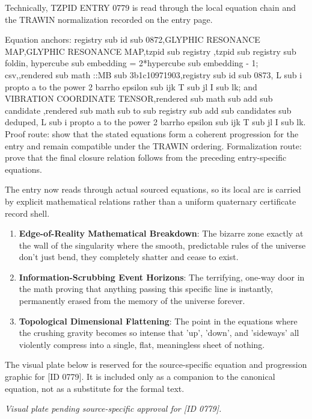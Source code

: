 Technically, TZPID ENTRY 0779 is read through the local equation chain and the TRAWIN normalization recorded on the entry page.

Equation anchors: registry sub id sub 0872,GLYPHIC RESONANCE MAP,GLYPHIC RESONANCE MAP,tzpid sub registry ,tzpid sub registry sub foldin, hypercube sub embedding = 2*hypercube sub embedding - 1; csv,,rendered sub math ::MB sub 3b1c10971903,registry sub id sub 0873, L sub i propto a to the power 2 barrho epsilon sub ijk T sub jl I sub lk; and VIBRATION COORDINATE TENSOR,rendered sub math sub add sub candidate ,rendered sub math sub to sub registry sub add sub candidates sub deduped, L sub i propto a to the power 2 barrho epsilon sub ijk T sub jl I sub lk. Proof route: show that the stated equations form a coherent progression for the entry and remain compatible under the TRAWIN ordering. Formalization route: prove that the final closure relation follows from the preceding entry-specific equations.

The entry now reads through actual sourced equations, so its local arc is carried by explicit mathematical relations rather than a uniform quaternary certificate record shell.
\endgroup

\begin{enumerate}[leftmargin=1.6em,itemsep=6pt,topsep=4pt]
\item \textbf{Edge-of-Reality Mathematical Breakdown}: The bizarre zone exactly at the wall of the singularity where the smooth, predictable rules of the universe don't just bend, they completely shatter and cease to exist.
\item \textbf{Information-Scrubbing Event Horizons}: The terrifying, one-way door in the math proving that anything passing this specific line is instantly, permanently erased from the memory of the universe forever.
\item \textbf{Topological Dimensional Flattening}: The point in the equations where the crushing gravity becomes so intense that 'up', 'down', and 'sideways' all violently compress into a single, flat, meaningless sheet of nothing.
\end{enumerate}

\begingroup\footnotesize\sloppy
The visual plate below is reserved for the source-specific equation and progression graphic for [ID 0779]. It is included only as a companion to the canonical equation, not as a substitute for the formal text.
\par\endgroup
\begingroup\footnotesize\itshape
Visual plate pending source-specific approval for [ID 0779].
\par\endgroup

